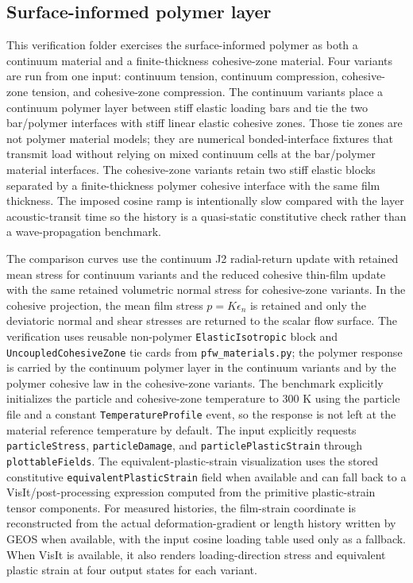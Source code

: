\subsection{Surface-informed polymer layer}
\label{sec:surfaceInformedPolymerLayer}

This verification folder exercises the surface-informed polymer as both a continuum material and a finite-thickness cohesive-zone material.  Four variants are run from one input: continuum tension, continuum compression, cohesive-zone tension, and cohesive-zone compression.  The continuum variants place a continuum polymer layer between stiff elastic loading bars and tie the two bar/polymer interfaces with stiff linear elastic cohesive zones.  Those tie zones are not polymer material models; they are numerical bonded-interface fixtures that transmit load without relying on mixed continuum cells at the bar/polymer material interfaces.  The cohesive-zone variants retain two stiff elastic blocks separated by a finite-thickness polymer cohesive interface with the same film thickness.  The imposed cosine ramp is intentionally slow compared with the layer acoustic-transit time so the history is a quasi-static constitutive check rather than a wave-propagation benchmark.

The comparison curves use the continuum J2 radial-return update with retained mean stress for continuum variants and the reduced cohesive thin-film update with the same retained volumetric normal stress for cohesive-zone variants.  In the cohesive projection, the mean film stress $p=K\epsilon_n$ is retained and only the deviatoric normal and shear stresses are returned to the scalar flow surface.  The verification uses reusable non-polymer \texttt{ElasticIsotropic} block and \texttt{UncoupledCohesiveZone} tie cards from \texttt{pfw\_materials.py}; the polymer response is carried by the continuum polymer layer in the continuum variants and by the polymer cohesive law in the cohesive-zone variants.  The benchmark explicitly initializes the particle and cohesive-zone temperature to 300 K using the particle file and a constant \texttt{TemperatureProfile} event, so the response is not left at the material reference temperature by default.  The input explicitly requests \texttt{particleStress}, \texttt{particleDamage}, and \texttt{particlePlasticStrain} through \texttt{plottableFields}.  The equivalent-plastic-strain visualization uses the stored constitutive \texttt{equivalentPlasticStrain} field when available and can fall back to a VisIt/post-processing expression computed from the primitive plastic-strain tensor components.  For measured histories, the film-strain coordinate is reconstructed from the actual deformation-gradient or length history written by GEOS when available, with the input cosine loading table used only as a fallback.  When VisIt is available, it also renders loading-direction stress and equivalent plastic strain at four output states for each variant.

